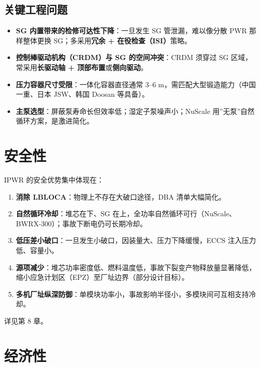 \documentclass[
  UTF8,
  scheme=plain,
  fontsize=10pt,
  openany
]{ctexbook}
\begin{document}
\subsection{关键工程问题}\label{ux5173ux952eux5de5ux7a0bux95eeux9898}

\begin{itemize}
\tightlist
\item
  \textbf{SG 内置带来的检修可达性下降}：一旦发生 SG 管泄漏，难以像分散
  PWR 那样整体更换 SG；多采用\textbf{冗余 + 在役检查（ISI）}策略。
\item
  \textbf{控制棒驱动机构（CRDM）与 SG 的空间冲突}：CRDM 须穿过 SG
  区域，常采用\textbf{长驱动轴 + 顶部布置}或\textbf{侧向驱动}。
\item
  \textbf{压力容器尺寸受限}：一体化容器直径通常 3--6
  m，需匹配大型锻造能力（中国一重、日本 JSW、韩国 Doosan 等具备）。
\item
  \textbf{主泵选型}：屏蔽泵寿命长但效率低；湿定子泵噪声小；NuScale
  用''无泵''自然循环方案，是激进简化。
\end{itemize}

\section{安全性}\label{ux5b89ux5168ux6027}

IPWR 的安全优势集中体现在：

\begin{enumerate}
\def\labelenumi{\arabic{enumi}.}
\tightlist
\item
  \textbf{消除 LBLOCA}：物理上不存在大破口途径，DBA 清单大幅简化。
\item
  \textbf{自然循环冷却}：堆芯在下、SG
  在上，全功率自然循环可行（NuScale、BWRX-300）；事故下断电仍可长期冷却。
\item
  \textbf{低压差小破口}：一旦发生小破口，因装量大、压力下降缓慢，ECCS
  注入压力低、容量小。
\item
  \textbf{源项减少}：堆芯功率密度低、燃料温度低，事故下裂变产物释放量显著降低，缩小应急计划区（EPZ）至厂址边界（部分设计目标）。
\item
  \textbf{多机厂址纵深防御}：单模块功率小，事故影响半径小，多模块间可互相支持冷却。
\end{enumerate}

详见第 8 章。

\section{经济性}\label{ux7ecfux6d4eux6027}
\end{document}
